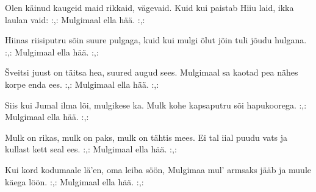 Olen k\"ainud kaugeid maid
rikkaid, v\"agevaid.
Kuid kui paistab Hiiu laid,
ikka laulan vaid:
:,: Mulgimaal ella h\"a\"a. :,:

Hiinas riisiputru s\~oin
suure pulgaga,
kuid kui mulgi \~olut j\~oin
tuli j\~oudu hulgana.
:,: Mulgimaal ella h\"a\"a. :,:

\v{S}veitsi juust on t\"aitsa hea,
suured augud sees.
Mulgimaal sa kaotad pea
n\"ahes korpe enda ees.
:,: Mulgimaal ella h\"a\"a. :,:

Siis kui Jumal ilma l\~oi,
mulgikese ka.
Mulk kohe kapsaputru s\~oi
hapukoorega.
:,: Mulgimaal ella h\"a\"a. :,:

Mulk on rikas, mulk on paks,
mulk on t\"ahtis mees.
Ei tal iial puudu vats
ja kullast kett seal ees.
:,: Mulgimaal ella h\"a\"a. :,:

Kui kord kodumaale l\"a'en,
oma leiba s\"o\"on,
Mulgimaa mul' armsaks j\"a\"ab
ja muule k\"aega l\"o\"on.
:,: Mulgimaal ella h\"a\"a. :,: